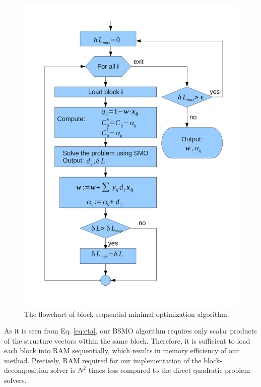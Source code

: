 \begin{figure}[H]
\begin{center}
\includegraphics[scale=0.5]{Scoring/Fig/Algorithm.pdf}
\caption[The flowchart of block sequential minimal optimization algorithm]{
The flowchart of block sequential minimal optimization algorithm.
}
\end{center}
\label{Fig:flowchart}
\end{figure}

As it is seen from Eq. \ref{eq:eta}, our BSMO algorithm requires only scalar products of the structure vectors within the same block. Therefore, it is sufficient to 
load each block into RAM sequentially, which results in memory efficiency of our method. Precisely,  RAM required for our implementation of the block-decomposition solver 
is $N^2$ times less compared to the direct quadratic problem solvers. 

